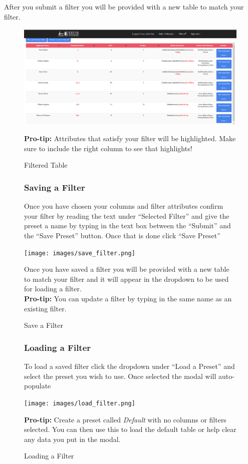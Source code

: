 \documentclass[fontsize=12pt,paper=letter,twoside]{scrartcl}
\begin{document}
\clearpage
After you submit a filter you will be provided with a new table to match your filter.
\begin{figure}[!htb]
\begin{center}
\includegraphics[width=.99\textwidth]{images/filtered_table.png}
\end{center}
\caption{Filtered Table}
\textbf{Pro-tip:} Attributes that satisfy your filter will be highlighted. Make sure to include the right column to see that highlights!
\label{fig:filtered_table}
\end{figure}

\clearpage 

\begin{figure}[!htb]
\subsubsection{Saving a Filter}
Once you have chosen your columns and filter attributes confirm your filter by reading the text under ``Selected Filter'' and give the preset a name by typing in the text box between the ``Submit'' and the ``Save Preset'' button. Once that is done click ``Save Preset''
\begin{center}
\texttt{[image: images/save\_filter.png]}
\end{center}
\caption{Save a Filter}
Once you have saved a filter you will be provided with a new table to match your filter and it will appear in the dropdown to be used for loading a filter.\\
\textbf{Pro-tip:} You can update a filter by typing in the same name as an existing filter.
\label{fig:save_filter}
\end{figure}

\clearpage
\begin{figure}[!htb]
\subsubsection{Loading a Filter}
To load a saved filter click the dropdown under ``Load a Preset'' and select the preset you wish to use. Once selected the modal will auto-populate
\begin{center}
\texttt{[image: images/load\_filter.png]}
\end{center}
\caption{Loading a Filter}
\textbf{Pro-tip:} Create a preset called \emph{Default} with no columns or filters selected. You can then use this to load the default table or help clear any data you put in the modal.
\label{fig:save_filter}
\end{figure}
\end{document}
